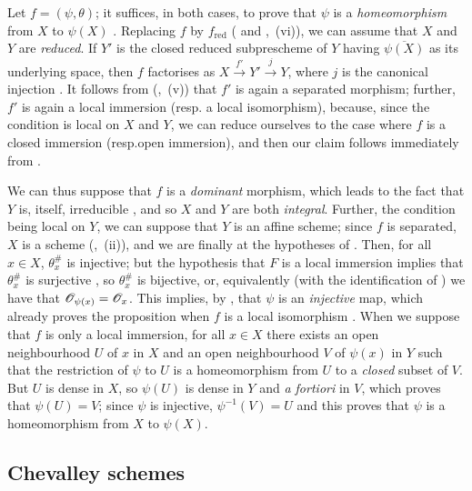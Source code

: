 \documentclass{book}
\begin{document}
Let $f=(\psi,\theta)$; it suffices, in both cases, to prove that $\psi$ is a
\emph{homeomorphism} from $X$ to $\psi(X)$ . Replacing $f$ by
$f_\mathrm{red}$ ( and ,~(vi)), we can assume that $X$
and $Y$ are \emph{reduced}. If $Y'$ is the closed reduced subprescheme of $Y$
having $\overline{\psi(X)}$ as its underlying space, then $f$ factorises as
$X\xrightarrow{f'}Y'\xrightarrow{j}Y$, where $j$ is the canonical injection
. It follows from (,~(v)) that $f'$ is again a
separated morphism; further, $f'$ is again a local immersion (resp.
a local isomorphism), because, since the condition is local on $X$ and $Y$, we
can reduce ourselves to the case where $f$ is a closed immersion (resp.open
immersion), and then our claim follows immediately from .

We can thus suppose that $f$ is a \emph{dominant} morphism, which leads to the
fact that $Y$ is, itself, irreducible , and so $X$ and $Y$
are both \emph{integral}. Further, the condition being local on $Y$, we can
suppose that $Y$ is an affine scheme; since $f$ is separated, $X$ is a scheme
(,~(ii)), and we are finally at the hypotheses of .
Then, for all $x\in X$, $\theta_x^\#$ is injective; but the hypothesis that $F$
is a local immersion implies that $\theta_x^\#$ is surjective , so
$\theta_x^\#$ is bijective, or, equivalently (with the identification of
) we have that $\mathscr{O}_{\psi(x)}=\mathscr{O}_x$. This implies, by ,
that $\psi$ is an \emph{injective} map, which already proves the proposition
when $f$ is a local isomorphism . When we suppose that $f$ is only
a local immersion, for all $x\in X$ there exists an open neighbourhood $U$ of
$x$ in $X$ and an open neighbourhood $V$ of $\psi(x)$ in $Y$ such that the
restriction of $\psi$ to $U$ is a homeomorphism from $U$ to a \emph{closed}
subset of $V$. But $U$ is dense in $X$, so $\psi(U)$ is dense in $Y$ and
\emph{a fortiori} in $V$, which proves that $\psi(U)=V$; since $\psi$ is
injective, $\psi^{-1}(V)=U$ and this proves that $\psi$ is a homeomorphism from
$X$ to $\psi(X)$.

\subsection{Chevalley schemes}
\label{1-schemes-8.3}
\end{document}
